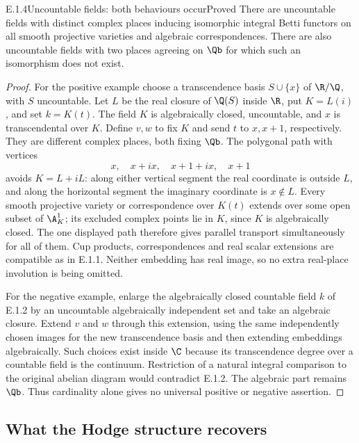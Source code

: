 \begin{result}{E.1.4}{Uncountable fields: both behaviours occur}{Proved}
There are uncountable fields with distinct complex places inducing isomorphic integral Betti functors on all smooth projective varieties and algebraic correspondences. There are also uncountable fields with two places agreeing on $\Qb$ for which such an isomorphism does not exist.
\end{result}
\begin{proof}
For the positive example choose a transcendence basis $S\cup\{x\}$ of $\R/\Q$, with $S$ uncountable. Let $L$ be the real closure of $\Q(S)$ inside $\R$, put $K=L(i)$, and set $k=K(t)$. The field $K$ is algebraically closed, uncountable, and $x$ is transcendental over $K$. Define $v,w$ to fix $K$ and send $t$ to $x,x+1$, respectively. They are different complex places, both fixing $\Qb$. The polygonal path with vertices
\[
 x,\quad x+ix,\quad x+1+ix,\quad x+1
\]
avoids $K=L+iL$: along either vertical segment the real coordinate is outside $L$, and along the horizontal segment the imaginary coordinate is $x\notin L$. Every smooth projective variety or correspondence over $K(t)$ extends over some open subset of $\A^1_K$; its excluded complex points lie in $K$, since $K$ is algebraically closed. The one displayed path therefore gives parallel transport simultaneously for all of them. Cup products, correspondences and real scalar extensions are compatible as in E.1.1. Neither embedding has real image, so no extra real-place involution is being omitted.

For the negative example, enlarge the algebraically closed countable field $k$ of E.1.2 by an uncountable algebraically independent set and take an algebraic closure. Extend $v$ and $w$ through this extension, using the same independently chosen images for the new transcendence basis and then extending embeddings algebraically. Such choices exist inside $\C$ because its transcendence degree over a countable field is the continuum. Restriction of a natural integral comparison to the original abelian diagram would contradict E.1.2. The algebraic part remains $\Qb$. Thus cardinality alone gives no universal positive or negative assertion.
\end{proof}

\subsection{What the Hodge structure recovers}

